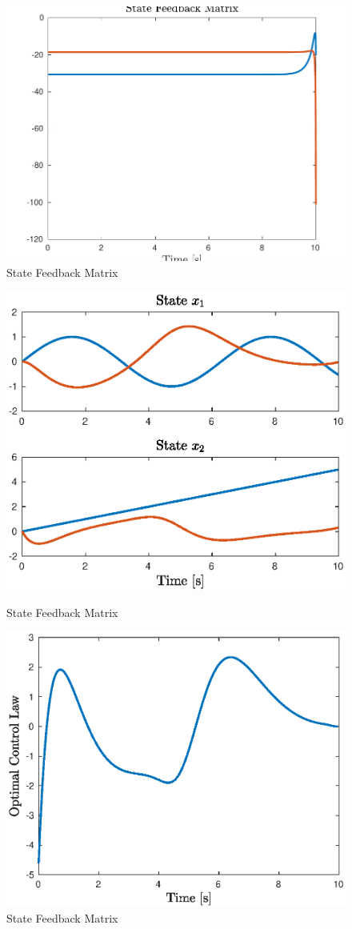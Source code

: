 \documentclass{article}
\begin{document}
\begin{center} \begin{figure}[h]
\includegraphics [width=4.5in]{sfm2}
\caption{State Feedback Matrix}
\end{figure}  \end{center}

\begin{center} \begin{figure}[h]
\includegraphics [width=4.5in]{states.eps}
\caption{State Feedback Matrix}

\includegraphics [width=4.5in]{control.eps}
\caption{State Feedback Matrix}
\end{figure}  \end{center}
\end{document}
